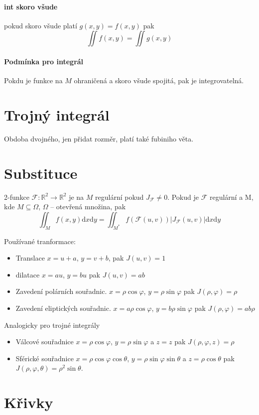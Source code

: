 \documentclass[a4paper, twoside,%
12pt]{article}
\newcommand{\dif}{\mathrm{d}}
\newcommand{\R}{\mathbb{R}}
\newcommand{\F}{\mathscr{F}}
\begin{document}
\paragraph{int skoro všude} pokud skoro všude platí $g(x,y)=f(x,y)$ pak 
$$ \iint f(x,y) = \iint g(x,y)$$

\paragraph{Podmínka pro integrál}
Pokdu je funkce na $M$ ohraničená a skoro všude spojitá, pak je integrovatelná.

\section{Trojný integrál}
Obdoba dvojného, jen přidat rozměr, platí také fubiniho věta.

\section{Substituce}
2-funkce $\F: \R^2 \to \R^2$ je na $M$ regulární pokud $J_\F \neq 0$. 
Pokud je $\F$ regulární a M, kde $M \subseteq \Omega$, $\Omega$ -- otevřená množina, pak
$$ \iint_{M} f(x,y) \dif x \dif y =  \iint_{M^*} f(\F(u,v)) |J_\F (u,v)| \dif x \dif y$$

Používané tranformace:
\begin{itemize}
    \item Translace $x=u+a$, $y = v + b$, pak $J(u,v) = 1$
    \item dilatace $x = au$, $y=bu$ pak $J(u,v) = ab$
    \item Zavedení polárních souřadnic. $x = \rho\cos\varphi$, $y=\rho\sin\varphi$ pak $J(\rho, \varphi) = \rho $ 
    \item Zavedení eliptických souřadnic. $x = a\rho\cos\varphi$, $y=b\rho\sin\varphi$ pak $J(\rho, \varphi) = ab\rho $ 
\end{itemize}
Analogicky pro trojné integrály
\begin{itemize}
    \item Válcové souřadnice $x = \rho\cos\varphi$, $y=\rho\sin\varphi$ a $z=z$ pak $J(\rho, \varphi, z) = \rho $ 
    \item Sférické souřadnice $x = \rho\cos\varphi\cos\theta$, $y=\rho\sin\varphi\sin\theta$ a $z=\rho\cos\theta$ pak $J(\rho, \varphi, \theta) = \rho^2\sin\theta. $ 
\end{itemize}

\section{Křivky}
\end{document}
